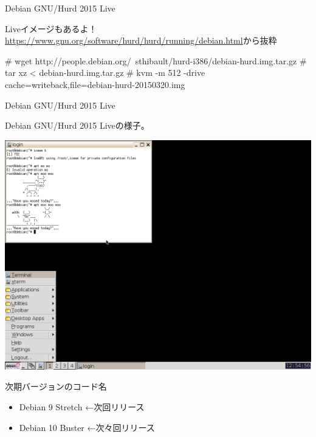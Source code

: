 \begin{frame}[containsverbatim]{Debian GNU/Hurd 2015 Live}

  Liveイメージもあるよ！\\
\url{https://www.gnu.org/software/hurd/hurd/running/debian.html}から抜粋

\begin{commandlinesmall}
# wget http://people.debian.org/~sthibault/hurd-i386/debian-hurd.img.tar.gz
# tar xz < debian-hurd.img.tar.gz
# kvm -m 512 -drive cache=writeback,file=debian-hurd-20150320.img
\end{commandlinesmall}
  
\end{frame}

\begin{frame}{Debian GNU/Hurd 2015 Live}

Debian GNU/Hurd 2015 Liveの様子。

\begin{center}
 \includegraphics[width=0.9\hsize]{image201509/gnu-hurd-live.png}
\end{center}
 
\end{frame}


\begin{frame}{次期バージョンのコード名}

  \begin{itemize}
  \item Debian 9 Stretch ←次回リリース
  \item Debian 10 Buster ←次々回リリース
  \end{itemize}
  
\end{frame}

